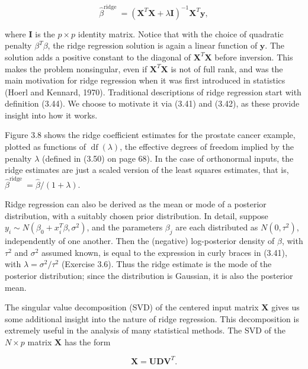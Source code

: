 \documentclass[10pt]{article}
\begin{document}
\begin{equation*}
\hat{\beta}^{\text {ridge }}=\left(\mathbf{X}^{T} \mathbf{X}+\lambda \mathbf{I}\right)^{-1} \mathbf{X}^{T} \mathbf{y}, \tag{3.44}
\end{equation*}


where $\mathbf{I}$ is the $p \times p$ identity matrix. Notice that with the choice of quadratic penalty $\beta^{T} \beta$, the ridge regression solution is again a linear function of $\mathbf{y}$. The solution adds a positive constant to the diagonal of $\mathbf{X}^{T} \mathbf{X}$ before inversion. This makes the problem nonsingular, even if $\mathbf{X}^{T} \mathbf{X}$ is not of full rank, and was the main motivation for ridge regression when it was first introduced in statistics (Hoerl and Kennard, 1970). Traditional descriptions of ridge regression start with definition (3.44). We choose to motivate it via (3.41) and (3.42), as these provide insight into how it works.

Figure 3.8 shows the ridge coefficient estimates for the prostate cancer example, plotted as functions of $\operatorname{df}(\lambda)$, the effective degrees of freedom implied by the penalty $\lambda$ (defined in (3.50) on page 68). In the case of orthonormal inputs, the ridge estimates are just a scaled version of the least squares estimates, that is, $\hat{\beta}^{\text {ridge }}=\hat{\beta} /(1+\lambda)$.

Ridge regression can also be derived as the mean or mode of a posterior distribution, with a suitably chosen prior distribution. In detail, suppose $y_{i} \sim N\left(\beta_{0}+x_{i}^{T} \beta, \sigma^{2}\right)$, and the parameters $\beta_{j}$ are each distributed as $N\left(0, \tau^{2}\right)$, independently of one another. Then the (negative) log-posterior density of $\beta$, with $\tau^{2}$ and $\sigma^{2}$ assumed known, is equal to the expression in curly braces in (3.41), with $\lambda=\sigma^{2} / \tau^{2}$ (Exercise 3.6). Thus the ridge estimate is the mode of the posterior distribution; since the distribution is Gaussian, it is also the posterior mean.

The singular value decomposition (SVD) of the centered input matrix $\mathbf{X}$ gives us some additional insight into the nature of ridge regression. This decomposition is extremely useful in the analysis of many statistical methods. The SVD of the $N \times p$ matrix $\mathbf{X}$ has the form


\begin{equation*}
\mathbf{X}=\mathbf{U D V}^{T} . \tag{3.45}
\end{equation*}
\end{document}
